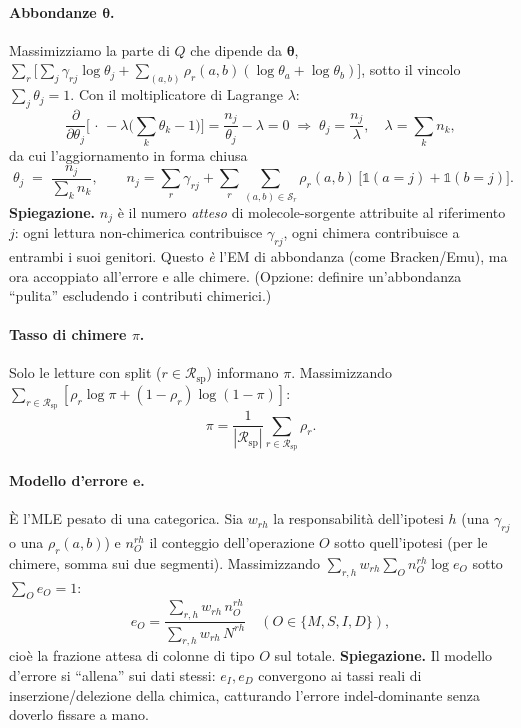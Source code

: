 \documentclass[11pt,a4paper]{article}
\newcommand{\bt}{\boldsymbol{\theta}}
\newcommand{\bpi}{\pi}
\newcommand{\ee}{\mathbf{e}}
\newcommand{\Split}{\mathcal{S}}
\newcommand{\I}{\mathbb{1}}
\begin{document}
\paragraph{Abbondanze $\bt$.} Massimizziamo la parte di $Q$ che dipende da $\bt$,
$\sum_r\big[\sum_j\gamma_{rj}\log\theta_j+\sum_{(a,b)}\rho_r(a,b)(\log\theta_a+\log\theta_b)\big]$,
sotto il vincolo $\sum_j\theta_j=1$. Con il moltiplicatore di Lagrange $\lambda$:
\[
\frac{\partial}{\partial\theta_j}\Big[\,\cdot\, -\lambda\big(\textstyle\sum_k\theta_k-1\big)\Big]=\frac{n_j}{\theta_j}-\lambda=0
\;\Rightarrow\;\theta_j=\frac{n_j}{\lambda},\quad \lambda=\sum_k n_k,
\]
da cui l'aggiornamento in forma chiusa
\begin{equation}
\boxed{\;\theta_j\;=\;\frac{n_j}{\sum_k n_k},\qquad n_j=\sum_r\gamma_{rj}+\sum_r\!\!\sum_{(a,b)\in\Split_r}\!\!\rho_r(a,b)\,\big[\I(a{=}j)+\I(b{=}j)\big].\;}
\label{eq:mstep-theta}
\end{equation}
\textbf{Spiegazione.} $n_j$ \`e il numero \emph{atteso} di molecole-sorgente attribuite al riferimento $j$: ogni lettura non-chimerica contribuisce $\gamma_{rj}$, ogni chimera contribuisce a entrambi i suoi genitori. Questo \emph{\`e} l'EM di abbondanza (come Bracken/Emu), ma ora accoppiato all'errore e alle chimere. (Opzione: definire un'abbondanza ``pulita'' escludendo i contributi chimerici.)

\paragraph{Tasso di chimere $\bpi$.} Solo le letture con split ($r\in\mathcal{R}_{\mathrm{sp}}$) informano $\bpi$. Massimizzando $\sum_{r\in\mathcal{R}_{\mathrm{sp}}}[\rho_r\log\bpi+(1-\rho_r)\log(1-\bpi)]$:
\begin{equation}
\boxed{\;\bpi=\frac{1}{|\mathcal{R}_{\mathrm{sp}}|}\sum_{r\in\mathcal{R}_{\mathrm{sp}}}\rho_r.\;}
\label{eq:mstep-pi}
\end{equation}

\paragraph{Modello d'errore $\ee$.} \`E l'MLE pesato di una categorica. Sia $w_{rh}$ la responsabilit\`a dell'ipotesi $h$ (una $\gamma_{rj}$ o una $\rho_r(a,b)$) e $n^{rh}_O$ il conteggio dell'operazione $O$ sotto quell'ipotesi (per le chimere, somma sui due segmenti). Massimizzando $\sum_{r,h}w_{rh}\sum_O n^{rh}_O\log e_O$ sotto $\sum_O e_O=1$:
\begin{equation}
\boxed{\;e_O=\frac{\sum_{r,h}w_{rh}\,n^{rh}_O}{\sum_{r,h}w_{rh}\,N^{rh}}\quad(O\in\{M,S,I,D\}),\;}
\label{eq:mstep-e}
\end{equation}
cio\`e la frazione attesa di colonne di tipo $O$ sul totale. \textbf{Spiegazione.} Il modello d'errore si ``allena'' sui dati stessi: $e_I,e_D$ convergono ai tassi reali di inserzione/delezione della chimica, catturando l'errore indel-dominante senza doverlo fissare a mano.
\end{document}
